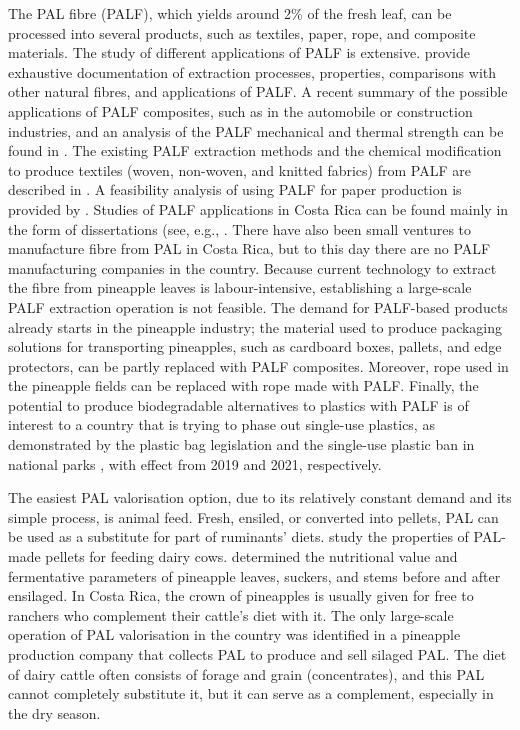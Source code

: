 The PAL fibre (PALF), which yields around 2\% of the fresh leaf, can be processed into several products, such as textiles, paper, rope, and composite materials. The study of different applications of PALF is extensive. \cite{rafiqah2020effect} provide exhaustive documentation of extraction processes, properties, comparisons with other natural fibres, and applications of PALF. A recent summary of the possible applications of PALF composites, such as in the automobile or construction industries, and an analysis of the PALF mechanical and thermal strength can be found in \cite{jain2022pineapple}. The existing PALF extraction methods and the chemical modification to produce textiles (woven, non-woven, and knitted fabrics) from PALF are described in \cite{jose2016overview}. A feasibility analysis of using PALF for paper production is provided by \cite{sibaly2017production}. Studies of PALF applications in Costa Rica can be found mainly in the form of dissertations (see, e.g., \cite{tecDissertation, cuerdaUCR, NanofibriUNA}. There have also been small ventures to manufacture fibre from PAL in Costa Rica, but to this day there are no PALF manufacturing companies in the country. Because current technology to extract the fibre from pineapple leaves is labour-intensive, establishing a large-scale PALF extraction operation is not feasible. The demand for PALF-based products already starts in the pineapple industry; the material used to produce packaging solutions for transporting pineapples, such as cardboard boxes, pallets, and edge protectors, can be partly replaced with PALF composites. Moreover, rope used in the pineapple fields can be replaced with rope made with PALF. Finally, the potential to produce biodegradable alternatives to plastics with PALF is of interest to a country that is trying to phase out single-use plastics, as demonstrated by the 	
plastic bag legislation \cite{LeyN9786} and the single-use plastic ban in national parks \cite{sinacPlastic}, with effect from 2019 and 2021, respectively. 

The easiest PAL valorisation option, due to its relatively constant demand and its simple process, is animal feed. Fresh, ensiled, or converted into pellets, PAL can be used as a substitute for part of ruminants' diets. \cite{buliah2019production} study the properties of PAL-made pellets for feeding dairy cows. \cite{lopez2009caracteristicas} determined the nutritional value and fermentative parameters of pineapple leaves, suckers, and stems before and after ensilaged. In Costa Rica, the crown of pineapples is usually given for free to ranchers who complement their cattle's diet with it. The only large-scale operation of PAL valorisation in the country was identified in a pineapple production company that collects PAL to produce and sell silaged PAL. The diet of dairy cattle often consists of forage and grain (concentrates), and this PAL cannot completely substitute it, but it can serve as a complement, especially in the dry season. 

